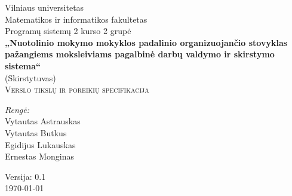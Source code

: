 \begin{titlepage}

  \begin{center}


    {\Large Vilniaus universitetas\\
    Matematikos ir informatikos fakultetas\\
    Programų sistemų 2 kurso 2 grupė}\\[6.0cm]

    \textbf{ \LARGE „Nuotolinio mokymo mokyklos padalinio 
    organizuojančio stovyklas pažangiems moksleiviams pagalbinė darbų 
    valdymo ir skirstymo sistema“ }\\
    { \Large (Skirstytuvas)}\\[0.5cm]

    \textsc{\Large Verslo tikslų ir poreikių specifikacija }\\[4.0cm]

    \begin{minipage}[]{0.8\textwidth}
      \begin{flushright} \large
        \emph{Rengė:} \\
        Vytautas Astrauskas \\
        Vytautas Butkus \\
        Egidijus Lukauskas \\
        Ernestas Monginas
      \end{flushright}
    \end{minipage}

    \vfill

    {\large  Versija: 0.1 \\ \today }
  \end{center}
  
\end{titlepage}
